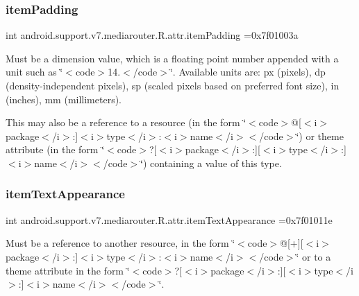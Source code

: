 \subsubsection{\texorpdfstring{item\+Padding}{itemPadding}}
{\footnotesize\ttfamily int android.\+support.\+v7.\+mediarouter.\+R.\+attr.\+item\+Padding =0x7f01003a\hspace{0.3cm}{\ttfamily [static]}}

Must be a dimension value, which is a floating point number appended with a unit such as \char`\"{}$<$code$>$14.\+5sp$<$/code$>$\char`\"{}. Available units are\+: px (pixels), dp (density-\/independent pixels), sp (scaled pixels based on preferred font size), in (inches), mm (millimeters). 

This may also be a reference to a resource (in the form \char`\"{}$<$code$>$@\mbox{[}$<$i$>$package$<$/i$>$\+:\mbox{]}$<$i$>$type$<$/i$>$\+:$<$i$>$name$<$/i$>$$<$/code$>$\char`\"{}) or theme attribute (in the form \char`\"{}$<$code$>$?\mbox{[}$<$i$>$package$<$/i$>$\+:\mbox{]}\mbox{[}$<$i$>$type$<$/i$>$\+:\mbox{]}$<$i$>$name$<$/i$>$$<$/code$>$\char`\"{}) containing a value of this type. \mbox{\label{classandroid_1_1support_1_1v7_1_1mediarouter_1_1R_1_1attr_a57b6a8878a26dcbd7f69a1615dc2a32b}} 
\subsubsection{\texorpdfstring{item\+Text\+Appearance}{itemTextAppearance}}
{\footnotesize\ttfamily int android.\+support.\+v7.\+mediarouter.\+R.\+attr.\+item\+Text\+Appearance =0x7f01011e\hspace{0.3cm}{\ttfamily [static]}}

Must be a reference to another resource, in the form \char`\"{}$<$code$>$@\mbox{[}+\mbox{]}\mbox{[}$<$i$>$package$<$/i$>$\+:\mbox{]}$<$i$>$type$<$/i$>$\+:$<$i$>$name$<$/i$>$$<$/code$>$\char`\"{} or to a theme attribute in the form \char`\"{}$<$code$>$?\mbox{[}$<$i$>$package$<$/i$>$\+:\mbox{]}\mbox{[}$<$i$>$type$<$/i$>$\+:\mbox{]}$<$i$>$name$<$/i$>$$<$/code$>$\char`\"{}. \mbox{\label{classandroid_1_1support_1_1v7_1_1mediarouter_1_1R_1_1attr_afe2ce20b1e376096dd7cf27f1bda4df5}} 
